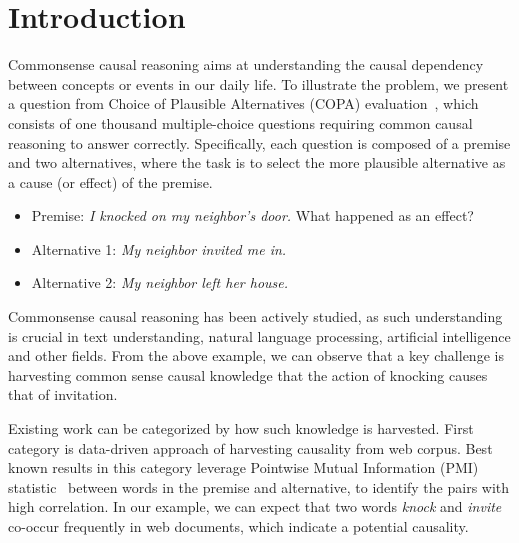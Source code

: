 \section{Introduction}
\label{sec:intro}
Commonsense causal reasoning aims at understanding the causal dependency
between concepts or events in our daily life. To illustrate the problem,
we present a question from
Choice of Plausible Alternatives (COPA) evaluation~\cite{gordon2012copa},
which consists of one thousand multiple-choice questions
requiring common causal reasoning to answer correctly.
Specifically, each question is composed of a premise and two alternatives,
where the task is to select the more plausible alternative as
a cause (or effect) of the premise.


\begin{itemize}
\item[] Premise: \emph{I knocked on my neighbor's door.} What happened as an
effect?
\item[] Alternative 1: \emph{My neighbor invited me in.}
\item[] Alternative 2: \emph{My neighbor left her house.}
\end{itemize}

Commonsense causal reasoning has been actively studied,
as such understanding is crucial in text understanding, natural
language processing, artificial intelligence and other fields.
From the above example, we can observe that a key challenge is
harvesting common sense causal knowledge
that the action of knocking causes that of invitation.

Existing work can be categorized by how such knowledge is harvested.
First category is data-driven approach of harvesting causality from web corpus.
Best known results in this category leverage
Pointwise Mutual Information (PMI) statistic~\cite{Mihalcea2006:CKM}
between words in the premise and alternative, to identify the pairs with
high correlation.
In our example, we can expect that two words \emph{knock} and \emph{invite}
co-occur frequently in web documents, which indicate a potential causality.

